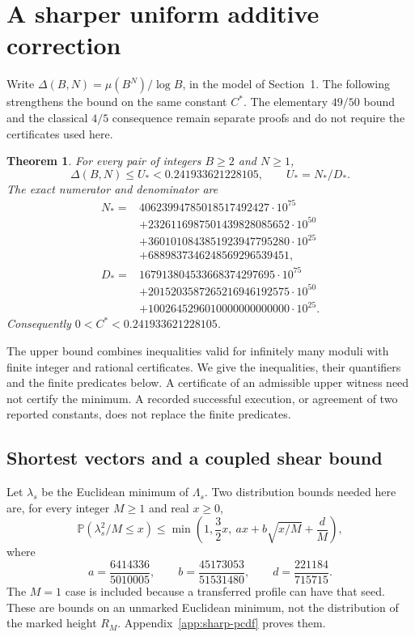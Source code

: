 \documentclass[11pt]{article}
\newtheorem{theorem}{Theorem}[section]
\theoremstyle{definition}\newtheorem{definition}[theorem]{Definition}
\theoremstyle{remark}\newtheorem{remark}[theorem]{Remark}
\newcommand{\Prb}{\mathbb P}
\begin{document}
\section{A sharper uniform additive correction}\label{sec:sharp-global}
Write \(\Delta(B,N)=\mu(B^N)/\log B\), in the model of
Section~1. The following strengthens the bound on the same constant \(C^*\).
The elementary \(49/50\) bound and the classical \(4/5\) consequence remain
separate proofs and do not require the certificates used here.

\begin{theorem}\label{thm:sharp-global}
For every pair of integers \(B\ge2\) and \(N\ge1\),
\[
 \Delta(B,N)\le U_*<0.241933621228105,
 \qquad U_*=N_*/D_* .
\]
The exact numerator and denominator are
\[
\begin{aligned}
N_*={}&40623994785018517492427\cdot10^{75}\\
 &+2326116987501439828085652\cdot10^{50}\\
 &+3601010843851923947795280\cdot10^{25}\\
 &+6889837346248569296539451,\\
D_*={}&167913804533668374297695\cdot10^{75}\\
 &+2015203587265216946192575\cdot10^{50}\\
 &+1002645296010000000000000\cdot10^{25} .
\end{aligned}
\]
Consequently \(0<C^*<0.241933621228105\).
\end{theorem}

The upper bound combines inequalities valid for infinitely many moduli with
finite integer and rational certificates. We give the inequalities, their
quantifiers and the finite predicates below. A certificate of an admissible
upper witness need not certify the minimum. A recorded successful execution,
or agreement of two reported constants, does not replace the finite predicates.

\subsection{Shortest vectors and a coupled shear bound}
Let \(\lambda_s\) be the Euclidean minimum of \(\Lambda_s\).
Two distribution bounds needed here are, for every integer \(M\ge1\)
and real \(x\ge0\),
\[
 \Prb(\lambda_s^2/M\le x)
 \le\min\left(1,\frac32x,\ a x+b\sqrt{x/M}+\frac dM\right),             \tag{S1}\label{eq:sharp-pcdf}
\]
where
\[
 a=\frac{6414336}{5010005},\qquad
 b=\frac{45173053}{51531480},\qquad d=\frac{221184}{715715}.
\]
The \(M=1\) case is included because a transferred profile can have that
seed. These are bounds on an unmarked Euclidean minimum, not the
distribution of the marked height \(R_M\).
Appendix~\ref{app:sharp-pcdf} proves them.
\end{document}
